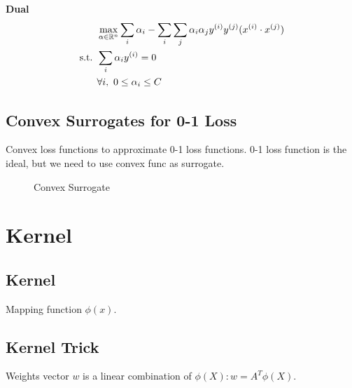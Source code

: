 \documentclass[a4paper]{report}
\begin{document}
\textbf{Dual}
\begin{align*}
& \max_{\alpha \in \mathbb{R}^n} \sum_i \alpha_i -\sum_i\sum_j \alpha_i \alpha_j y^{(i)}y^{(j)}(x^{(i)}\cdot
x^{(j)}) \\
\text{s.t. } & \sum_i \alpha_i y^{(i)} = 0\\
& \forall i,~0\leq \alpha_i \leq C
\end{align*}

\section{Convex Surrogates for 0-1 Loss}
Convex loss functions to approximate 0-1 loss functions. 0-1 loss function is the ideal, but we need to use convex func as surrogate.

\begin{figure}[!htp]
\centering
{}
\caption{Convex Surrogate}
\label{fig:convexSurrogates}
\end{figure}


\chapter{Kernel}
\section{Kernel}
Mapping function $\phi(x)$. 
\section{Kernel Trick}
Weights vector $w$ is a linear combination of $\phi(X): w=A^T\phi(X)$.
\end{document}
